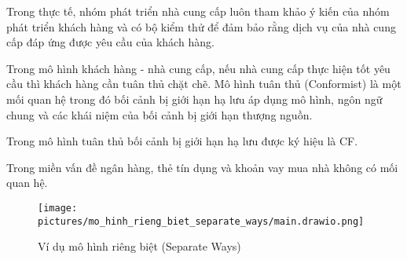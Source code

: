 Trong thực tế, nhóm phát triển nhà cung cấp luôn tham khảo ý kiến của nhóm phát triển khách hàng và có bộ kiểm thử để đảm bảo rằng dịch vụ của nhà cung cấp đáp ứng được yêu cầu của khách hàng.


Trong mô hình khách hàng - nhà cung cấp, nếu nhà cung cấp thực hiện tốt yêu cầu thì khách hàng cần tuân thủ chặt chẽ. Mô hình tuân thủ (Conformist) là một mối quan hệ trong đó bối cảnh bị giới hạn hạ lưu áp dụng mô hình, ngôn ngữ chung và các khái niệm của bối cảnh bị giới hạn thượng nguồn.

Trong mô hình tuân thủ bối cảnh bị giới hạn hạ lưu được ký hiệu là CF.






















\begin{example} Trong miền vấn đề ngân hàng, thẻ tín dụng và khoản vay mua nhà không có mối quan hệ.

    \begin{figure}[H]

        \centering

        \texttt{[image: pictures/mo\_hinh\_rieng\_biet\_separate\_ways/main.drawio.png]}

        \caption{Ví dụ mô hình riêng biệt (Separate Ways)}

    \end{figure}

\end{example}

